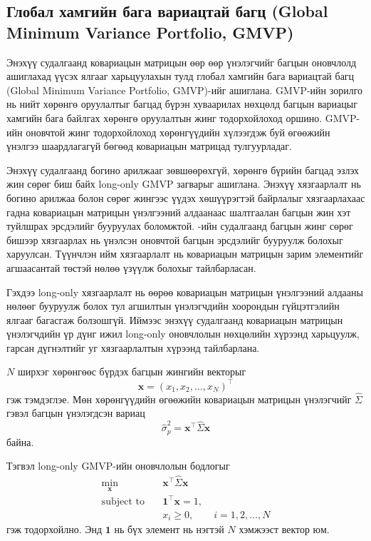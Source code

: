 \subsection{Глобал хамгийн бага вариацтай багц (Global Minimum Variance Portfolio, GMVP)}

Энэхүү судалгаанд ковариацын матрицын өөр өөр үнэлэгчийг багцын оновчлолд ашиглахад үүсэх ялгааг харьцуулахын тулд глобал хамгийн бага вариацтай багц (Global Minimum Variance Portfolio, GMVP)-ийг ашиглана. GMVP-ийн зорилго нь нийт хөрөнгө оруулалтыг багцад бүрэн хуваарилах нөхцөлд багцын вариацыг хамгийн бага байлгах хөрөнгө оруулалтын жинг тодорхойлоход оршино. GMVP-ийн оновчтой жинг тодорхойлоход хөрөнгүүдийн хүлээгдэж буй өгөөжийн үнэлгээ шаардлагагүй бөгөөд ковариацын матрицад тулгуурладаг.

Энэхүү судалгаанд богино арилжааг зөвшөөрөхгүй, хөрөнгө бүрийн багцад эзлэх жин сөрөг биш байх long-only GMVP загварыг ашиглана. Энэхүү хязгаарлалт нь богино арилжаа болон сөрөг жингээс үүдэх хөшүүрэгтэй байрлалыг хязгаарлахаас гадна ковариацын матрицын үнэлгээний алдаанаас шалтгаалан багцын жин хэт туйлшрах эрсдэлийг бууруулах боломжтой. \citet{JagannathanMa2003}-ийн судалгаанд багцын жинг сөрөг бишээр хязгаарлах нь үнэлсэн оновчтой багцын эрсдэлийг бууруулж болохыг харуулсан. Түүнчлэн ийм хязгаарлалт нь ковариацын матрицын зарим элементийг агшаасантай төстэй нөлөө үзүүлж болохыг тайлбарласан.

Гэхдээ long-only хязгаарлалт нь өөрөө ковариацын матрицын үнэлгээний алдааны нөлөөг бууруулж болох тул агшилтын үнэлэгчдийн хоорондын гүйцэтгэлийн ялгааг багасгаж болзошгүй. Иймээс энэхүү судалгаанд ковариацын матрицын үнэлэгчдийн үр дүнг ижил long-only оновчлолын нөхцөлийн хүрээнд харьцуулж, гарсан дүгнэлтийг уг хязгаарлалтын хүрээнд тайлбарлана.

$N$ ширхэг хөрөнгөөс бүрдэх багцын жингийн векторыг
\[
\boldsymbol{x}
=
(x_1,x_2,\ldots,x_N)^\top
\]
гэж тэмдэглэе. Мөн хөрөнгүүдийн өгөөжийн ковариацын матрицын үнэлэгчийг $\widehat{\Sigma}$ гэвэл багцын үнэлэгдсэн вариац
\[
\widehat{\sigma}_p^2
=
\boldsymbol{x}^{\top}
\widehat{\Sigma}
\boldsymbol{x}
\]
байна.

Тэгвэл long-only GMVP-ийн оновчлолын бодлогыг
\[
\begin{aligned}
	\min_{\boldsymbol{x}}\quad&
	\boldsymbol{x}^{\top}\widehat{\Sigma}\boldsymbol{x}\\
	\text{subject to}\quad&
	\boldsymbol{1}^{\top}\boldsymbol{x}=1,\\
	&x_i\geq 0,\qquad i=1,2,\ldots,N
\end{aligned}
\]
гэж тодорхойлно. Энд $\boldsymbol{1}$ нь бүх элемент нь нэгтэй $N$ хэмжээст вектор юм.

